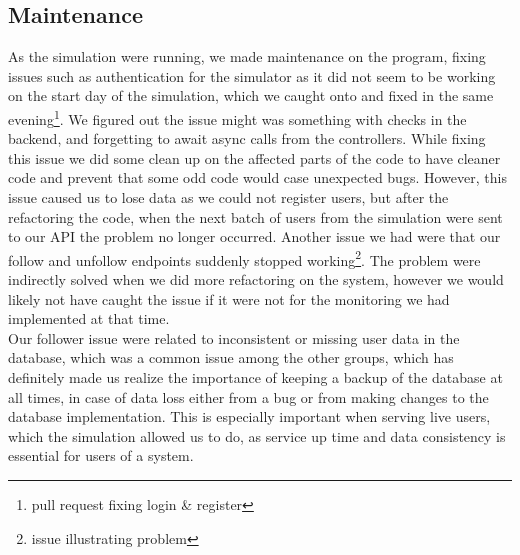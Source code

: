 \subsection{Maintenance}
As the simulation were running, we made maintenance on the program, fixing issues such as authentication for the simulator as it did not seem to be working on the start day of the simulation, which we caught onto and fixed in the same evening\footnote{pull request fixing login \& register\cite{loginIssue}}.
We figured out the issue might was something with checks in the backend, and forgetting to await async calls from the controllers. While fixing this issue we did some clean up on the affected parts of the code to have cleaner code and prevent that some odd code would case unexpected bugs. However, this issue caused us to lose data as we could not register users, but after the refactoring the code, when the next batch of users from the simulation were sent to our API the problem no longer occurred.
Another issue we had were that our follow and unfollow endpoints suddenly stopped working\footnote{issue illustrating problem\cite{issue172}}. The problem were indirectly solved when we did more refactoring on the system, however we would likely not have caught the issue if it were not for the monitoring we had implemented at that time.\\
Our follower issue were related to inconsistent or missing user data in the database, which was a common issue among the other groups, which has definitely made us realize the importance of keeping a backup of the database at all times, in case of data loss either from a bug or from making changes to the database implementation. This is especially important when serving live users, which the simulation allowed us to do, as service up time and data consistency is essential for users of a system.

